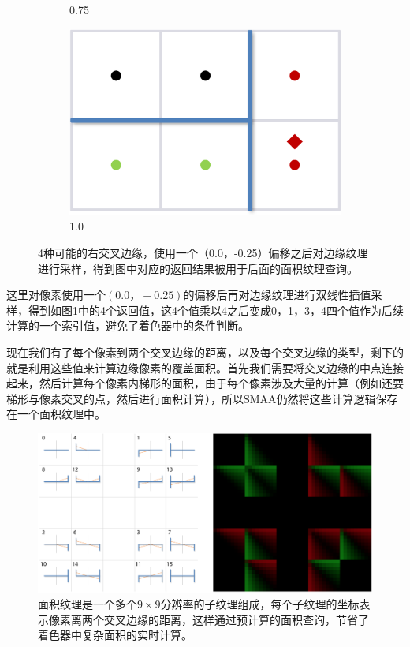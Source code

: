 \begin{figure}
\begin{subfigure}[b]{0.24\textwidth}
		\caption{0.75}
	\end{subfigure}
	\begin{subfigure}[b]{0.24\textwidth}
		\includegraphics[width=1.\textwidth]{figures/shade/crossing-edges-4}
		\caption{1.0}
	\end{subfigure}
\caption{4种可能的右交叉边缘，使用一个（0.0，-0.25）偏移之后对边缘纹理进行采样，得到图中对应的返回结果被用于后面的面积纹理查询。}
\label{f:shade-crossing-edges}
\end{figure}

这里对像素使用一个$(0.0，-0.25)$的偏移后再对边缘纹理进行双线性插值采样，得到如图\ref{f:shade-crossing-edges}中的4个返回值，这4个值乘以4之后变成0，1，3，4四个值作为后续计算的一个索引值，避免了着色器中的条件判断。

现在我们有了每个像素到两个交叉边缘的距离，以及每个交叉边缘的类型，剩下的就是利用这些值来计算边缘像素的覆盖面积。首先我们需要将交叉边缘的中点连接起来，然后计算每个像素内梯形的面积，由于每个像素涉及大量的计算（例如还要梯形与像素交叉的点，然后进行面积计算），所以SMAA仍然将这些计算逻辑保存在一个面积纹理中。

\begin{figure}
\begin{fullwidth}
	\includegraphics[width=\thewidth]{figures/shade/edge}
	\caption{面积纹理是一个多个$9\times 9$分辨率的子纹理组成，每个子纹理的坐标表示像素离两个交叉边缘的距离，这样通过预计算的面积查询，节省了着色器中复杂面积的实时计算。}
	\label{f:shade-edge}
\end{fullwidth}
\end{figure}

